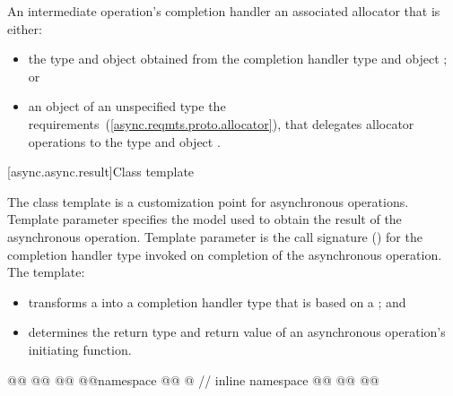 An intermediate operation's completion handler  an associated allocator that is either:

\begin{itemize}
\item
the type  and object  obtained from the completion handler type  and object ; or

\item
an object of an unspecified type  the  requirements~(\ref{async.reqmts.proto.allocator}), that delegates allocator operations to the type  and object .
\end{itemize}



[async.async.result]{Class template }

%
\pnum
The  class template is a customization point for asynchronous operations. Template parameter  specifies the model used to obtain the result of the asynchronous operation. Template parameter  is the call signature () for the completion handler type invoked on completion of the asynchronous operation. The  template:

\begin{itemize}
\item
transforms a  into a completion handler type that is based on a ; and

\item
determines the return type and return value of an asynchronous operation's initiating function.
\end{itemize}

\begin{codeblock}
@@
@@
@@
@@namespace @@ @ // inline namespace \namespacever
@@
@@
@@
\end{codeblock}

